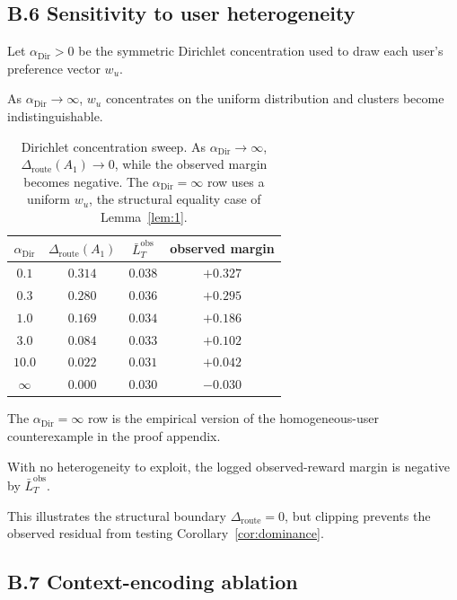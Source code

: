 \documentclass{article} %
\begin{document}
\subsection{B.6 Sensitivity to user heterogeneity}

\label{app:dirichlet-sweep}

Let \(\alpha_{\mathrm{Dir}}>0\) be the symmetric Dirichlet concentration used
to draw each user's preference vector \(w_u\).

As \(\alpha_{\mathrm{Dir}}\to\infty\), \(w_u\) concentrates on the uniform
distribution and clusters become indistinguishable.

\begin{table}[h]
\centering
\small
\begin{tabular}{cccc}
\toprule
\(\alpha_{\mathrm{Dir}}\) & $\Delta_{\mathrm{route}}(A_1)$ & $\bar L_T^{\mathrm{obs}}$ & observed margin \\
\midrule
$0.1$  & $0.314$ & $0.038$ & $+0.327$ \\
$0.3$  & $0.280$ & $0.036$ & $+0.295$ \\
$1.0$  & $0.169$ & $0.034$ & $+0.186$ \\
$3.0$  & $0.084$ & $0.033$ & $+0.102$ \\
$10.0$ & $0.022$ & $0.031$ & $+0.042$ \\
$\infty$ & $0.000$ & $0.030$ & $-0.030$ \\
\bottomrule
\end{tabular}
\caption{Dirichlet concentration sweep. As
\(\alpha_{\mathrm{Dir}}\to\infty\),
\(\Delta_{\mathrm{route}}(A_1)\to0\), while the observed margin becomes
negative. The \(\alpha_{\mathrm{Dir}}=\infty\) row uses a uniform \(w_u\), the structural
equality case of Lemma~\ref{lem:1}.}
\label{tab:app-dirichlet}
\end{table}

The \(\alpha_{\mathrm{Dir}}=\infty\) row is the empirical version of the
homogeneous-user counterexample in the proof appendix.

With no heterogeneity to exploit, the logged observed-reward margin is negative
by \(\bar L_T^{\mathrm{obs}}\).

This illustrates the structural boundary \(\Delta_{\mathrm{route}}=0\), but
clipping prevents the observed residual from testing
Corollary~\ref{cor:dominance}.

\subsection{B.7 Context-encoding ablation}
\end{document}
